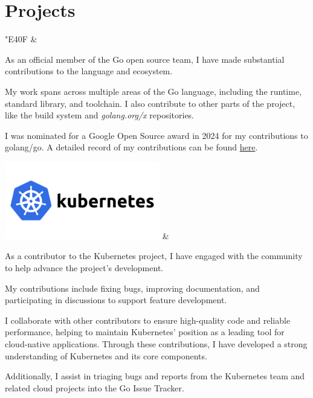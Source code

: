 \documentclass[]{cv-mauri}
\begin{document}
\section*{Projects}
\begin{tabularcv}
	{\Huge \color[HTML]{76E1FE} \FAB \char"E40F} & 

		As an official member of the Go open source team, I have made substantial contributions to the language and ecosystem.

		My work spans across multiple areas of the Go language, including the runtime, standard library, and toolchain. I also contribute to other parts of the project, like the build system and \textit{golang.org/x} repositories.

		I was nominated for a Google Open Source award in 2024 for my contributions to golang/go.
		A detailed record of my contributions can be found \color{maincolor}\href{https://go-review.googlesource.com/q/author:mauri870@gmail.com}{here}.
\end{tabularcv}

\begin{tabularcv}
	\includegraphics[scale=1.5]{images/k8s.png} & 

	As a contributor to the Kubernetes project, I have engaged with the community to help advance the project's development.
	
	My contributions include fixing bugs, improving documentation, and participating in discussions to support feature development. 
	
	I collaborate with other contributors to ensure high-quality code and reliable performance, helping to maintain Kubernetes' position as a leading tool for cloud-native applications. Through these contributions, I have developed a strong understanding of Kubernetes and its core components.

	Additionally, I assist in triaging bugs and reports from the Kubernetes team and related cloud projects into the Go Issue Tracker.
\end{tabularcv}
\end{document}
